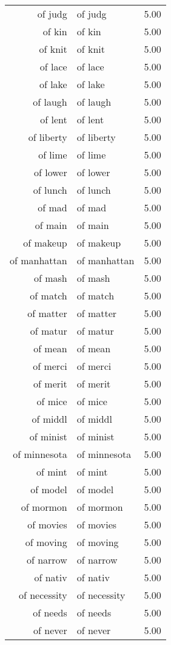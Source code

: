 \begin{table}[ht]
\begin{tabular}{rlr}
  of judg & of judg & 5.00 \\ 
  of kin & of kin & 5.00 \\ 
  of knit & of knit & 5.00 \\ 
  of lace & of lace & 5.00 \\ 
  of lake & of lake & 5.00 \\ 
  of laugh & of laugh & 5.00 \\ 
  of lent & of lent & 5.00 \\ 
  of liberty & of liberty & 5.00 \\ 
  of lime & of lime & 5.00 \\ 
  of lower & of lower & 5.00 \\ 
  of lunch & of lunch & 5.00 \\ 
  of mad & of mad & 5.00 \\ 
  of main & of main & 5.00 \\ 
  of makeup & of makeup & 5.00 \\ 
  of manhattan & of manhattan & 5.00 \\ 
  of mash & of mash & 5.00 \\ 
  of match & of match & 5.00 \\ 
  of matter & of matter & 5.00 \\ 
  of matur & of matur & 5.00 \\ 
  of mean & of mean & 5.00 \\ 
  of merci & of merci & 5.00 \\ 
  of merit & of merit & 5.00 \\ 
  of mice & of mice & 5.00 \\ 
  of middl & of middl & 5.00 \\ 
  of minist & of minist & 5.00 \\ 
  of minnesota & of minnesota & 5.00 \\ 
  of mint & of mint & 5.00 \\ 
  of model & of model & 5.00 \\ 
  of mormon & of mormon & 5.00 \\ 
  of movies & of movies & 5.00 \\ 
  of moving & of moving & 5.00 \\ 
  of narrow & of narrow & 5.00 \\ 
  of nativ & of nativ & 5.00 \\ 
  of necessity & of necessity & 5.00 \\ 
  of needs & of needs & 5.00 \\ 
  of never & of never & 5.00 \\ 

\end{tabular}
\end{table}
